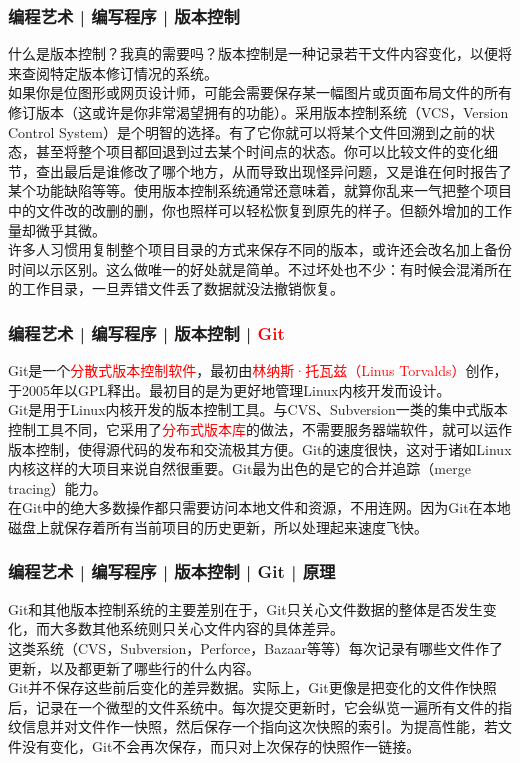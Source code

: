 \begin{frame}
  \frametitle{编程艺术 | 编写程序 | 版本控制}
  什么是版本控制？我真的需要吗？版本控制是一种记录若干文件内容变化，以便将来查阅特定版本修订情况的系统。\\
  \vspace{1em}
  如果你是位图形或网页设计师，可能会需要保存某一幅图片或页面布局文件的所有修订版本（这或许是你非常渴望拥有的功能）。采用版本控制系统（VCS，Version Control System）是个明智的选择。有了它你就可以将某个文件回溯到之前的状态，甚至将整个项目都回退到过去某个时间点的状态。你可以比较文件的变化细节，查出最后是谁修改了哪个地方，从而导致出现怪异问题，又是谁在何时报告了某个功能缺陷等等。使用版本控制系统通常还意味着，就算你乱来一气把整个项目中的文件改的改删的删，你也照样可以轻松恢复到原先的样子。但额外增加的工作量却微乎其微。\\
  \vspace{1em}
  许多人习惯用复制整个项目目录的方式来保存不同的版本，或许还会改名加上备份时间以示区别。这么做唯一的好处就是简单。不过坏处也不少：有时候会混淆所在的工作目录，一旦弄错文件丢了数据就没法撤销恢复。
\end{frame}

\begin{frame}
  \frametitle{编程艺术 | 编写程序 | 版本控制 | \textcolor{red}{Git}}
  Git是一个\textcolor{red}{分散式版本控制软件}，最初由\textcolor{red}{林纳斯·托瓦兹（Linus Torvalds）}创作，于2005年以GPL释出。最初目的是为更好地管理Linux内核开发而设计。\\
  \vspace{1em}
  Git是用于Linux内核开发的版本控制工具。与CVS、Subversion一类的集中式版本控制工具不同，它采用了\textcolor{red}{分布式版本库}的做法，不需要服务器端软件，就可以运作版本控制，使得源代码的发布和交流极其方便。Git的速度很快，这对于诸如Linux内核这样的大项目来说自然很重要。Git最为出色的是它的合并追踪（merge tracing）能力。\\
  \vspace{1em}
  在Git中的绝大多数操作都只需要访问本地文件和资源，不用连网。因为Git在本地磁盘上就保存着所有当前项目的历史更新，所以处理起来速度飞快。
\end{frame}

\begin{frame}
  \frametitle{编程艺术 | 编写程序 | 版本控制 | Git | 原理}
Git和其他版本控制系统的主要差别在于，Git只关心文件数据的整体是否发生变化，而大多数其他系统则只关心文件内容的具体差异。\\
  \vspace{1em}
  这类系统（CVS，Subversion，Perforce，Bazaar等等）每次记录有哪些文件作了更新，以及都更新了哪些行的什么内容。\\
  \vspace{1em}
  Git并不保存这些前后变化的差异数据。实际上，Git更像是把变化的文件作快照后，记录在一个微型的文件系统中。每次提交更新时，它会纵览一遍所有文件的指纹信息并对文件作一快照，然后保存一个指向这次快照的索引。为提高性能，若文件没有变化，Git不会再次保存，而只对上次保存的快照作一链接。
\end{frame}

